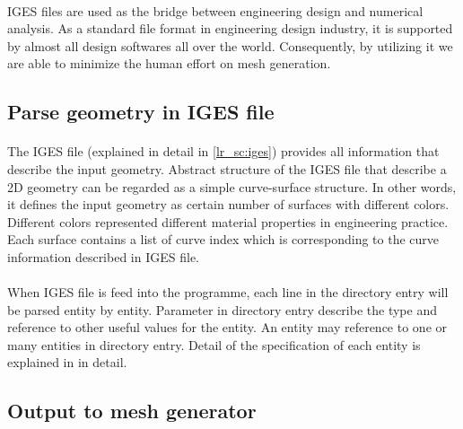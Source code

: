 \paragraph{}
IGES\cite{IGES1983} files are used as the bridge between engineering design and numerical analysis.
As a standard file format in engineering design industry, it is supported by almost all design softwares all over the world.
Consequently, by utilizing it we are able to minimize the human effort on mesh generation.

\subsection{Parse geometry in IGES file}
\paragraph{}
The IGES file (explained in detail in \ref{lr_sc:iges}) provides all information that describe the input geometry.
Abstract structure of the IGES file that describe a 2D geometry can be regarded as a simple curve-surface structure.
In other words, it defines the input geometry as certain number of surfaces with different colors.
Different colors represented different material properties in engineering practice.
Each surface contains a list of curve index which is corresponding to the curve information described in IGES file.

\paragraph{}
When IGES file is feed into the programme, each line in the directory entry will be parsed entity by entity.
Parameter in directory entry describe the type and reference to other useful values for the entity.
An entity may reference to one or many entities in directory entry.
Detail of the specification of each entity is explained in \cite{Nasr2007} in detail.

\subsection{Output to mesh generator}
